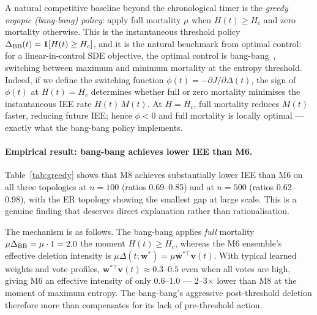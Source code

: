 \documentclass[review,12pt]{elsarticle}
\newcommand{\bfw}{\mathbf{w}}
\newcommand{\bfv}{\mathbf{v}}
\newcommand{\Hc}{H_c}
\begin{document}
A natural competitive baseline beyond the chronological timer is the
\emph{greedy myopic (bang-bang) policy}: apply full mortality $\mu$ when
$H(t) \geq \Hc$ and zero mortality otherwise.  This is the instantaneous
threshold policy $\Delta_{\rm BB}(t) = \mathbf{1}[H(t) \geq \Hc]$, and
it is the natural benchmark from optimal control: for a linear-in-control
SDE objective, the optimal control is bang-bang~\cite{oksendal2003stochastic},
switching between maximum and minimum mortality at the entropy threshold.
Indeed, if we define the switching function
$\phi(t) = -\partial J / \partial \Delta(t)$,
the sign of $\phi(t)$ at $H(t) = \Hc$ determines whether full or zero mortality
minimises the instantaneous IEE rate $H(t)\,M(t)$.  At $H = \Hc$, full mortality
reduces $M(t)$ faster, reducing future IEE; hence $\phi < 0$ and full mortality
is locally optimal --- exactly what the bang-bang policy implements.

\paragraph{Empirical result: bang-bang achieves lower IEE than M6.}
Table~\ref{tab:greedy} shows that M8 achieves substantially lower IEE than M6
on all three topologies at $n=100$ (ratios 0.69--0.85) and at $n=500$
(ratios 0.62--0.98), with the ER topology showing the smallest gap at large scale.
This is a genuine finding that deserves direct explanation rather than rationalisation.

The mechanism is as follows.  The bang-bang applies \emph{full} mortality
$\mu\Delta_{\rm BB} = \mu \cdot 1 = 2.0$ the moment $H(t) \geq \Hc$, whereas
the M6 ensemble's effective deletion intensity is $\mu\Delta(t;\bfw^*) = \mu
\bfw^{*\top}\bfv(t)$.  With typical learned weights and vote profiles,
$\bfw^{*\top}\bfv(t) \approx 0.3$--$0.5$ even when all votes are high,
giving M6 an effective intensity of only $0.6$--$1.0$ --- 2--3$\times$ lower
than M8 at the moment of maximum entropy.  The bang-bang's aggressive post-threshold
deletion therefore more than compensates for its lack of pre-threshold action.
\end{document}
